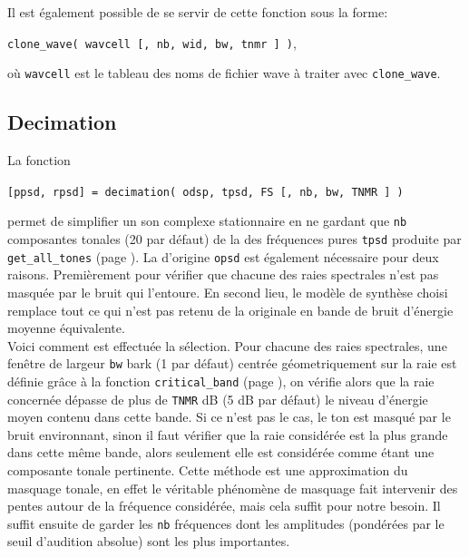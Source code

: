     Il est {\'e}galement possible de se servir de cette fonction
    sous la forme:
    \begin{center}
    {\tt clone\_wave( wavcell [, nb, wid, bw, tnmr ] )},
    \end{center}
    o{\`u} {\tt wavcell} est le tableau des noms de fichier wave {\`a}
    traiter avec {\tt clone\_wave}.


    \newpage
    \subsection{Decimation}
    \label{decimation}
    La fonction
    \begin{center}
    {\tt [ppsd, rpsd] = decimation( odsp, tpsd, FS [, nb, bw, TNMR ] )}
    \end{center}
    permet de simplifier un son complexe stationnaire en
    ne gardant que {\tt nb} composantes tonales (20 par d{\'e}faut) de
    la \dsp des fr{\'e}quences pures {\tt tpsd} produite par {\tt get\_all\_tones}
    (page \pageref{getalltones}). La \dsp d'origine {\tt opsd} est
    {\'e}galement n{\'e}cessaire pour deux raisons. Premi{\`e}rement pour
    v{\'e}rifier que chacune des raies spectrales n'est pas masqu{\'e}e
    par le bruit qui l'entoure. En second lieu, le mod{\`e}le de
    synth{\`e}se choisi remplace tout ce qui n'est pas retenu de la \dsp
    originale en bande de bruit d'{\'e}nergie moyenne {\'e}quivalente.\\

    Voici comment est effectu{\'e}e la s{\'e}lection. Pour chacune des raies
    spectrales, une fen{\^e}tre de largeur {\tt bw} bark (1
    par d{\'e}faut) centr{\'e}e g{\'e}ometriquement sur la raie est d{\'e}finie gr{\^a}ce {\`a} la
    fonction {\tt critical\_band} (page \pageref{criticalband}),
    on v{\'e}rifie alors que la raie concern{\'e}e d{\'e}passe de plus de
    {\tt TNMR} dB (5 dB par d{\'e}faut) le niveau d'{\'e}nergie moyen
    contenu dans cette bande. Si ce n'est pas le cas, le ton
    est masqu{\'e} par le bruit environnant, sinon il faut v{\'e}rifier
    que la raie consid{\'e}r{\'e}e est la plus grande dans cette m{\^e}me bande,
    alors seulement elle est consid{\'e}r{\'e}e comme {\'e}tant une
    composante tonale pertinente.
    Cette m{\'e}thode est une approximation du masquage tonale, en
    effet le v{\'e}ritable ph{\'e}nom{\`e}ne de masquage fait intervenir des
    pentes autour de la fr{\'e}quence consid{\'e}r{\'e}e, mais cela suffit
    pour notre besoin. Il suffit ensuite de garder les {\tt nb}
    fr{\'e}quences dont les amplitudes (pond{\'e}r{\'e}es par le seuil
    d'audition absolue) sont les plus importantes.\\

